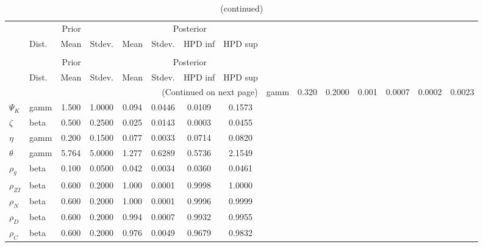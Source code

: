 
\begin{center}
\begin{longtable}{llcccccc} 
\caption{Results from Metropolis-Hastings (parameters)}
 \label{Table:MHPosterior:1}\\
\toprule 
  & \multicolumn{3}{c}{Prior}  &  \multicolumn{4}{c}{Posterior} \\
  \cmidrule(r{.75em}){2-4} \cmidrule(r{.75em}){5-8}
  & Dist. & Mean  & Stdev. & Mean & Stdev. & HPD inf & HPD sup\\
\midrule \endfirsthead 
\caption{(continued)}\\\toprule 
  & \multicolumn{3}{c}{Prior}  &  \multicolumn{4}{c}{Posterior} \\
  \cmidrule(r{.75em}){2-4} \cmidrule(r{.75em}){5-8}
  & Dist. & Mean  & Stdev. & Mean & Stdev. & HPD inf & HPD sup\\
\midrule \endhead 
\bottomrule \multicolumn{8}{r}{(Continued on next page)} \endfoot 
\bottomrule \endlastfoot 
${\sigma_a}$ & gamm &   0.320 & 0.2000 &   0.001& 0.0007 &  0.0002 &  0.0023 \\ 
${\Psi_K}$ & gamm &   1.500 & 1.0000 &   0.094& 0.0446 &  0.0109 &  0.1573 \\ 
${\zeta}$ & beta &   0.500 & 0.2500 &   0.025& 0.0143 &  0.0003 &  0.0455 \\ 
${\eta}$ & gamm &   0.200 & 0.1500 &   0.077& 0.0033 &  0.0714 &  0.0820 \\ 
${\theta}$ & gamm &   5.764 & 5.0000 &   1.277& 0.6289 &  0.5736 &  2.1549 \\ 
${\rho_g}$ & beta &   0.100 & 0.0500 &   0.042& 0.0034 &  0.0360 &  0.0461 \\ 
${\rho_{ZI}}$ & beta &   0.600 & 0.2000 &   1.000& 0.0001 &  0.9998 &  1.0000 \\ 
${\rho_N}$ & beta &   0.600 & 0.2000 &   1.000& 0.0001 &  0.9996 &  0.9999 \\ 
${\rho_D}$ & beta &   0.600 & 0.2000 &   0.994& 0.0007 &  0.9932 &  0.9955 \\ 
${\rho_C}$ & beta &   0.600 & 0.2000 &   0.976& 0.0049 &  0.9679 &  0.9832 \\ 
\end{longtable}
 \end{center}
